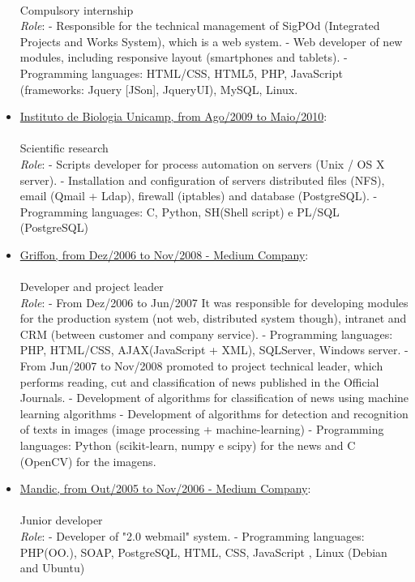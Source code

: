 \documentclass[a4paper,11pt]{article}
\begin{document}
\begin{itemize}
{\small \\  
  Compulsory internship\\
  \emph{Role}: 
  \subitem - Responsible for the technical management of SigPOd (Integrated Projects and Works System), which is a web system.
  \subitem - Web developer of new modules, including responsive layout (smartphones and tablets).
  \subitem - Programming languages: HTML/CSS, HTML5, PHP, JavaScript (frameworks: Jquery [JSon], JqueryUI), MySQL, Linux.
}  
\item \underline{Instituto de Biologia Unicamp, from Ago/2009 to Maio/2010}: \\
  {\small \\ 
  Scientific research\\
  \emph{Role}: 
  \subitem - Scripts developer for process automation on servers (Unix / OS X server).
  \subitem - Installation and configuration of servers distributed files (NFS), email (Qmail + Ldap), firewall (iptables) and database (PostgreSQL).
  \subitem - Programming languages:  C, Python, SH(Shell script) e PL/SQL (PostgreSQL)\\
}

\item \underline{Griffon, from Dez/2006 to Nov/2008 - Medium Company}: \\
{\small \\ 
  Developer and project leader\\
  \emph{Role}: 
  \subitem - From Dez/2006 to Jun/2007 It was responsible for developing modules for the production system (not web, distributed system though), intranet and CRM (between customer and company service).
  \subsubitem - Programming languages: PHP, HTML/CSS, AJAX(JavaScript + XML), SQLServer, Windows server.
  \subitem - From Jun/2007 to Nov/2008 promoted to project technical leader, which performs reading, cut and classification of news published in the Official Journals.
	\subsubitem - Development of algorithms for classification of news using machine learning algorithms
	\subsubitem - Development of algorithms for detection and recognition of texts in images (image processing + machine-learning)
	\subsubitem - Programming languages: Python (scikit-learn, numpy e scipy) for the news and C (OpenCV) for the imagens.\\
}
\item \underline{Mandic, from Out/2005 to Nov/2006 - Medium Company}:\\
{\small \\ 
	  Junior developer\\
	  \emph{Role}: 
	  \subitem - Developer of "2.0 webmail" system.
	  \subitem - Programming languages: PHP(OO.), SOAP, PostgreSQL, HTML, CSS, JavaScript , Linux (Debian and Ubuntu)
}


\end{itemize}
\end{document}
